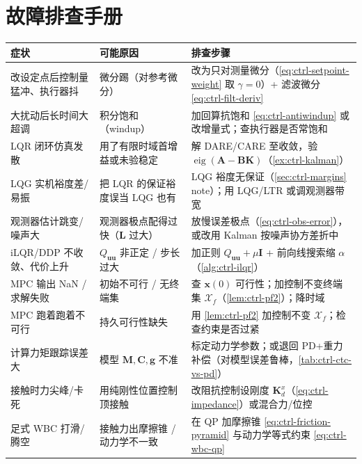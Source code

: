 \section*{故障排查手册}
\begin{table}[H]\centering\small
\begin{tabular}{p{} p{} p{}}
\toprule
症状 & 可能原因 & 排查步骤 \\
\midrule
改设定点后控制量猛冲、执行器抖 & 微分踢（对参考微分） & 改为只对测量微分（\cref{eq:ctrl-setpoint-weight} 取 $\gamma=0$）+ 滤波微分 \cref{eq:ctrl-filt-deriv} \\
大扰动后长时间大超调 & 积分饱和（windup） & 加回算抗饱和 \cref{eq:ctrl-antiwindup} 或改增量式；查执行器是否常饱和 \\
LQR 闭环仿真发散 & 用了有限时域首增益或未验稳定 & 解 DARE/CARE 至收敛，验 $\operatorname{eig}(\mathbf{A}-\mathbf{B}\mathbf{K})$（\cref{ex:ctrl-kalman}） \\
LQG 实机裕度差/易振 & 把 LQR 的保证裕度误当 LQG 也有 & LQG 裕度无保证（\cref{sec:ctrl-margins} note）；用 LQG/LTR 或调观测器带宽 \\
观测器估计跳变/噪声大 & 观测器极点配得过快（$\mathbf{L}$ 过大） & 放慢误差极点（\cref{eq:ctrl-obs-error}），或改用 Kalman 按噪声协方差折中 \\
iLQR/DDP 不收敛、代价上升 & $Q_{\mathbf{u}\mathbf{u}}$ 非正定 / 步长过大 & 加正则 $Q_{\mathbf{u}\mathbf{u}}+\mu\mathbf{I}$ + 前向线搜索缩 $\alpha$（\cref{alg:ctrl-ilqr}） \\
MPC 输出 NaN / 求解失败 & 初始不可行 / 无终端集 & 查 $\mathbf{x}(0)$ 可行性；加控制不变终端集 $\mathcal{X}_f$（\cref{lem:ctrl-pf2}）；降时域 \\
MPC 跑着跑着不可行 & 持久可行性缺失 & 用 \cref{lem:ctrl-pf2} 加控制不变 $\mathcal{X}_f$；检查约束是否过紧 \\
计算力矩跟踪误差大 & 模型 $\mathbf{M},\mathbf{C},\mathbf{g}$ 不准 & 标定动力学参数；或退回 PD+重力补偿（对模型误差鲁棒，\cref{tab:ctrl-ctc-vs-pd}） \\
接触时力尖峰/卡死 & 用纯刚性位置控制顶接触 & 改阻抗控制设刚度 $\mathbf{K}_d^x$（\cref{eq:ctrl-impedance}）或混合力/位控 \\
足式 WBC 打滑/腾空 & 接触力出摩擦锥 / 动力学不一致 & 在 QP 加摩擦锥 \cref{eq:ctrl-friction-pyramid} 与动力学等式约束 \cref{eq:ctrl-wbc-qp} \\
\bottomrule
\end{tabular}
\end{table}

